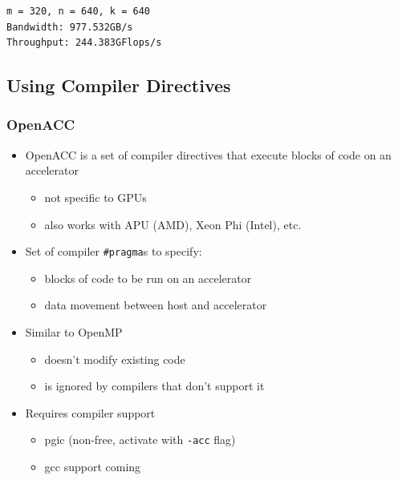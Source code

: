 \begin{verbatim}
m = 320, n = 640, k = 640
Bandwidth: 977.532GB/s
Throughput: 244.383GFlops/s
\end{verbatim}

\subsection{Using Compiler Directives}\label{using-compiler-directives}

\subsubsection{OpenACC}\label{openacc}

\begin{itemize}
\itemsep1pt\parskip0pt
\item
  OpenACC is a set of compiler directives that execute blocks of code on
  an accelerator

  \begin{itemize}
  \itemsep1pt\parskip0pt
  \item
    not specific to GPUs
  \item
    also works with APU (AMD), Xeon Phi (Intel), etc.
  \end{itemize}
\item
  Set of compiler \texttt{\#pragma}s to specify:

  \begin{itemize}
  \itemsep1pt\parskip0pt
  \item
    blocks of code to be run on an accelerator
  \item
    data movement between host and accelerator
  \end{itemize}
\item
  Similar to OpenMP

  \begin{itemize}
  \itemsep1pt\parskip0pt
  \item
    doesn't modify existing code
  \item
    is ignored by compilers that don't support it
  \end{itemize}
\item
  Requires compiler support

  \begin{itemize}
  \itemsep1pt\parskip0pt
  \item
    pgic (non-free, activate with \texttt{-acc} flag)
  \item
    gcc support coming
  \end{itemize}
\end{itemize}

